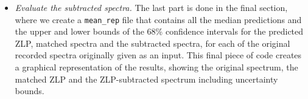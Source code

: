 \begin{itemize}
\item {\it Evaluate the subtracted spectra.}
%
The last part is done in the final section, where we create a {\tt mean\_rep} file that contains
all the median predictions and the upper and lower bounds of the 68\% confidence intervals for 
the predicted ZLP, matched spectra and the subtracted spectra, for each of the original recorded
spectra originally given as an input. 
%
This final piece of code creates a graphical representation
of the results, showing the original spectrum, the matched
ZLP and the ZLP-subtracted spectrum including uncertainty bounds. 


\end{itemize}



















